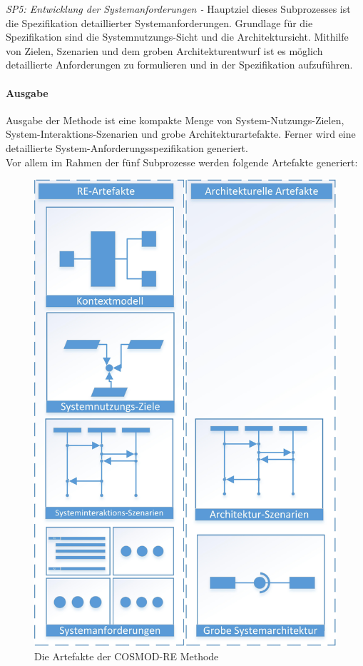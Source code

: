 \emph{SP5: Entwicklung der Systemanforderungen -}
Hauptziel dieses Subprozesses ist die Spezifikation detaillierter Systemanforderungen. Grundlage f\"ur die Spezifikation sind die Systemnutzungs-Sicht und die Architektursicht. Mithilfe von Zielen, Szenarien und dem groben Architekturentwurf ist es m\"oglich detaillierte Anforderungen zu formulieren und in der Spezifikation aufzuf\"uhren.\\

\paragraph{Ausgabe}
Ausgabe der Methode ist eine kompakte Menge von System-Nutzungs-Zielen, System-Interaktions-Szenarien und grobe Architekturartefakte. Ferner wird eine detaillierte System-Anforderungsspezifikation generiert.\\

Vor allem im Rahmen der f\"unf Subprozesse werden folgende Artefakte generiert:\\

\begin{figure}[h]
	\centering
	\includegraphics[scale=0.8]{artefakte.jpg} 
	\caption{Die Artefakte der COSMOD-RE Methode}\label{art}
\end{figure}

